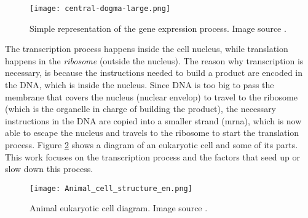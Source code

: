 \begin{figure}[htb]
  \centering
  \texttt{[image: central-dogma-large.png]}
  \caption{Simple representation of the gene expression process. Image source \cite{transcript_translation_diagram}.}
  \label{fig:BB:tt}
\end{figure}

The transcription process happens inside the cell nucleus, while translation happens in the \textit{ribosome} (outside the nucleus). The reason why transcription is necessary, is because the instructions needed to build a product are encoded in the DNA, which is inside the nucleus. Since DNA is too big to pass the membrane that covers the nucleus (nuclear envelop) to travel to the ribosome (which is the organelle in charge of building the product), the necessary instructions in the DNA are copied into a smaller strand (\gls{mrna}), which is now able to escape the nucleus and travels to the ribosome to start the translation process. Figure \ref{fig:BB:euka} shows a diagram of an eukaryotic cell and some of its parts. This work focuses on the transcription process and the factors that seed up or slow down this process.

\begin{figure}[htb]
  \centering
  \texttt{[image: Animal\_cell\_structure\_en.png]}
  \caption{Animal eukaryotic cell diagram. Image source \cite{eukacell}.}
  \label{fig:BB:euka}
\end{figure}
